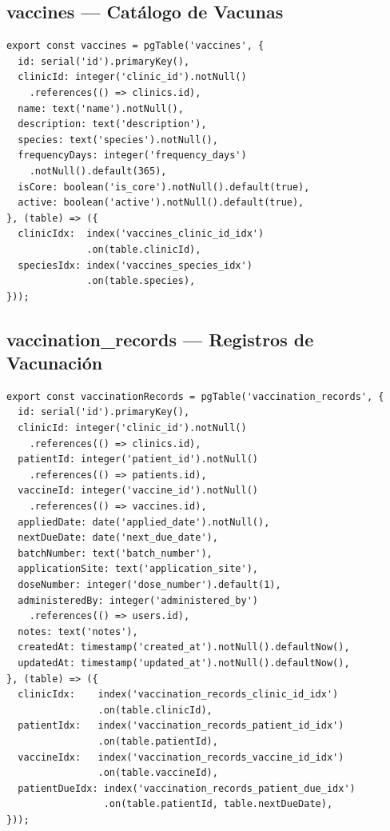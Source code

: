 \subsection{vaccines --- Cat\'alogo de Vacunas}

\begin{lstlisting}[style=typescript, caption=Esquema vaccines]
export const vaccines = pgTable('vaccines', {
  id: serial('id').primaryKey(),
  clinicId: integer('clinic_id').notNull()
    .references(() => clinics.id),
  name: text('name').notNull(),
  description: text('description'),
  species: text('species').notNull(),
  frequencyDays: integer('frequency_days')
    .notNull().default(365),
  isCore: boolean('is_core').notNull().default(true),
  active: boolean('active').notNull().default(true),
}, (table) => ({
  clinicIdx:  index('vaccines_clinic_id_idx')
              .on(table.clinicId),
  speciesIdx: index('vaccines_species_idx')
              .on(table.species),
}));
\end{lstlisting}

\subsection{vaccination\_records --- Registros de Vacunaci\'on}

\begin{lstlisting}[style=typescript, caption=Esquema vaccination\_records]
export const vaccinationRecords = pgTable('vaccination_records', {
  id: serial('id').primaryKey(),
  clinicId: integer('clinic_id').notNull()
    .references(() => clinics.id),
  patientId: integer('patient_id').notNull()
    .references(() => patients.id),
  vaccineId: integer('vaccine_id').notNull()
    .references(() => vaccines.id),
  appliedDate: date('applied_date').notNull(),
  nextDueDate: date('next_due_date'),
  batchNumber: text('batch_number'),
  applicationSite: text('application_site'),
  doseNumber: integer('dose_number').default(1),
  administeredBy: integer('administered_by')
    .references(() => users.id),
  notes: text('notes'),
  createdAt: timestamp('created_at').notNull().defaultNow(),
  updatedAt: timestamp('updated_at').notNull().defaultNow(),
}, (table) => ({
  clinicIdx:    index('vaccination_records_clinic_id_idx')
                .on(table.clinicId),
  patientIdx:   index('vaccination_records_patient_id_idx')
                .on(table.patientId),
  vaccineIdx:   index('vaccination_records_vaccine_id_idx')
                .on(table.vaccineId),
  patientDueIdx: index('vaccination_records_patient_due_idx')
                 .on(table.patientId, table.nextDueDate),
}));
\end{lstlisting}

